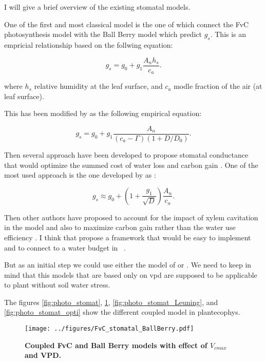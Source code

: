 \documentclass[a4paper,11pt]{article}
\begin{document}
I will give a brief overview of the existing stomatal models. 

One of the first and most classical model is the one of \citet{Collatz-1991} which connect the FvC photosynthesis model with the Ball Berry model which predict $g_s$. This is an empricial relationship based on the follwing equation:

\begin{equation}
\label{eq:gs-Ball}
g_s= g_0 + g_1 \frac{A_n h_s}{c_a}.
\end{equation}

where $h_s$ relative humidity at the leaf surface, and $c_a$ modle fraction of the air (at leaf surface).

This has been modified by \citet{Leuning-1995} as the following empirical equation:

\begin{equation}
\label{eq:gs-Leuning}
g_s= g_0 + g_1 \frac{A_n }{(c_a - \Gamma)(1+D/D_0)}.
\end{equation}

Then several approach have been developed to propose stomatal conductance that would optimize the summed cost of water loss and carbon gain \citet{Medlyn-2002,Prentice-2014,Wolf-2016,Sperry-2017}. One of the most used approach is the one developed by \citep{Medlyn-2011} as :

\begin{equation}
\label{eq:gs-Medlyn}
g_s \approx g_0 + (1 + \frac{g_1}{\sqrt{D}}) \frac{A_n }{c_a}.
\end{equation}


Then other authors have proposed to account for the impact of xylem cavitation \citet{Wolf-2016,Sperry-2016,Sperry-2017} in the model and also to maximize carbon gain rather than the water use efficiency \citet{Wolf-2016}. I think that \citep{Sperry-2016} propose a framework that would be easy to implement and to connect to a water budget in \plant\ . 

But as an initial step we could use either the model of \citep{Medlyn-2011} or \citep{Leuning-1995}. We need to keep in mind that this models that are based only on vpd are supposed to be applicable to plant without soil water stress.
 
The figures \ref{fig:photo_stomat}, \ref{fig:photo_stomat_BB}, \ref{fig:photo_stomat_Leuning}, and \ref{fig:photo_stomat_opti} show the different coupled model in plantecophys. 

\begin{figure}[ht]
\centering
\texttt{[image: ../figures/FvC\_stomatal\_BallBerry.pdf]}
\caption{\textbf{Coupled FvC and Ball Berry models with effect of $V_{cmax}$ and VPD.}
\label{fig:photo_stomat_BB}}
\end{figure}
\end{document}
